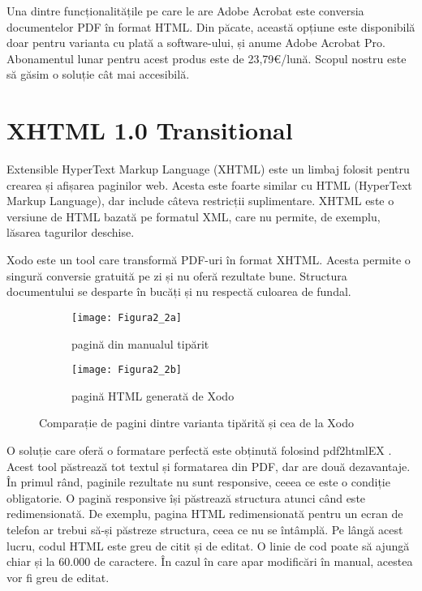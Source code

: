 Una dintre funcționalitățile pe care le are Adobe Acrobat este conversia documentelor PDF în format HTML. Din păcate, această opțiune este disponibilă doar pentru varianta cu plată a software-ului, și anume Adobe Acrobat Pro. Abonamentul lunar pentru acest produs este de 23,79€/lună. Scopul nostru este să găsim o soluție cât mai accesibilă.


\section{XHTML 1.0 Transitional}

Extensible HyperText Markup Language (XHTML) \cite{musciano2006html} este un limbaj folosit pentru crearea și afișarea paginilor web. Acesta este foarte similar cu HTML (HyperText Markup Language), dar include câteva restricții suplimentare. XHTML este o versiune de HTML bazată pe formatul XML, care nu permite, de exemplu, lăsarea tagurilor deschise.

Xodo este un tool care transformă PDF-uri în format XHTML. Acesta permite o singură conversie gratuită pe zi și nu oferă rezultate bune. Structura documentului se desparte în bucăți și nu respectă culoarea de fundal.
\begin{figure}[H]
	\centering
	\begin{subfigure}{.5\textwidth}
		\centering
		\texttt{[image: Figura2\_2a]}
		\caption{pagină din manualul tipărit}
		\label{fig:Figura2_2a}
	\end{subfigure}%
	\begin{subfigure}{.5\textwidth}
		\centering
		\texttt{[image: Figura2\_2b]}
		\caption{pagină HTML generată de Xodo}
		\label{fig:Figura2_2b}
	\end{subfigure}
	\caption{Comparație de pagini dintre varianta tipărită și cea de la Xodo}
	\label{fig:Figura2_2}
\end{figure}

O soluție care oferă o formatare perfectă este obținută folosind pdf2htmlEX \cite{wang2013online}. Acest tool păstrează tot textul și formatarea din PDF, dar are două dezavantaje. În primul rând, paginile rezultate nu sunt responsive, ceeea ce este o condiție obligatorie. O pagină responsive își păstrează structura atunci când este redimensionată. De exemplu, pagina HTML redimensionată pentru un ecran de telefon ar trebui să-și păstreze structura, ceea ce nu se întâmplă. Pe lângă acest lucru, codul HTML este greu de citit și de editat. O linie de cod poate să ajungă chiar și la 60.000 de caractere. În cazul în care apar modificări în manual, acestea vor fi greu de editat.

